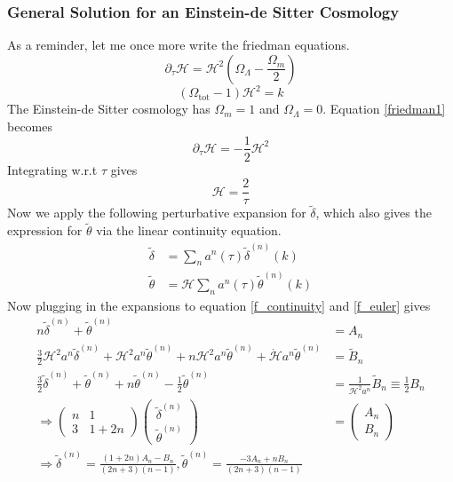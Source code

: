 \subsubsection{General Solution for an Einstein-de Sitter Cosmology}
As a reminder, let me once more write the friedman equations.
\begin{equation}\label{friedman1}
	\partial_\tau \mathcal{H} = \mathcal{H}^2 \left( \Omega_\Lambda -\frac{\Omega_m}{2} \right)
\end{equation}
\begin{equation}\label{friedman2}
	(\Omega_\mathrm{tot} - 1) \mathcal{H}^2 = k
\end{equation}
The Einstein-de Sitter cosmology has $\Omega_m = 1$ and $\Omega_\Lambda=0$. Equation \ref{friedman1} becomes
\begin{equation}
	\partial_\tau \mathcal{H} = -\frac{1}{2}\mathcal{H}^2
\end{equation}
Integrating w.r.t $\tau$ gives
\begin{equation}
	\mathcal{H} = \frac{2}{\tau}
\end{equation}
Now we apply the following perturbative expansion for $\tilde{\delta}$, which also gives the expression for $\tilde{\theta}$ via the linear continuity equation.
\begin{equation}
	\begin{split}
		\tilde \delta &= \sum_n a^n(\tau)\tilde\delta^{(n)}(k) \\
		\tilde \theta &= \mathcal{H}\sum_n a^{n}(\tau) \tilde{\theta}^{(n)}(k)
	\end{split}
\end{equation}
Now plugging in the expansions to equation \ref{f_continuity} and \ref{f_euler} gives
\begin{equation}
	\begin{split}
		n\tilde{\delta}^{(n)} + \tilde{\theta}^{(n)} &= A_n \\
		\frac{3}{2}\mathcal{H}^2a^{n}\tilde{\delta}^{(n)} + \mathcal{H}^2a^{n}\tilde{\theta}^{(n)} + n\mathcal{H}^2a^{n}\tilde{\theta}^{(n)}+\dot{\mathcal{H}}a^{n}\tilde{\theta}^{(n)} &= \tilde{B}_n \\
		\frac{3}{2}\tilde{\delta}^{(n)}+\tilde{\theta}^{(n)}+n\tilde{\theta}^{(n)}-\frac{1}{2}\tilde{\theta}^{(n)} &=\frac{1}{\mathcal{H}^2a^n}\tilde{B}_n \equiv \frac{1}{2}B_n \\
		\Rightarrow \left(\begin{array}{cc}
		n & 1\\
		3 & 1+2n
		\end{array}\right)
		\left(\begin{array}{c}
		\tilde{\delta}^{(n)} \\
		\tilde{\theta}^{(n)}
		\end{array}\right)
		&=
		\left(\begin{array}{c}
		A_n \\
		B_n
		\end{array}\right) \\
		\Rightarrow \tilde{\delta}^{(n)} = \frac{(1+2n)A_n - B_n}{(2n+3)(n-1)}, \tilde{\theta}^{(n)}=\frac{-3A_n+nB_n}{(2n+3)(n-1)}
	\end{split}
\end{equation}

